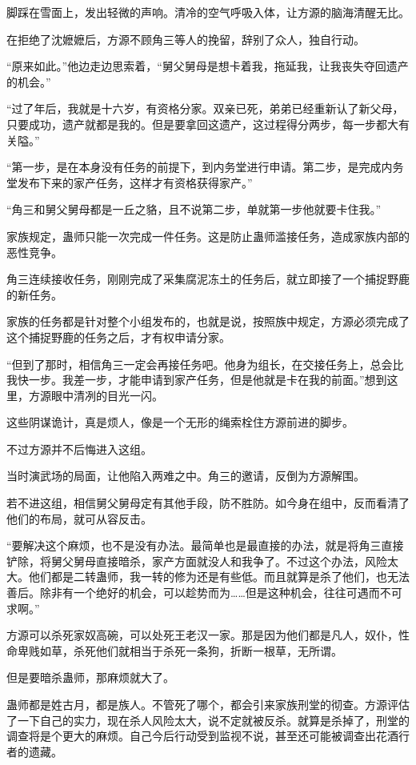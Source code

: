 \begin{this_body}
脚踩在雪面上，发出轻微的声响。清冷的空气呼吸入体，让方源的脑海清醒无比。

在拒绝了沈嬷嬷后，方源不顾角三等人的挽留，辞别了众人，独自行动。

“原来如此。”他边走边思索着，“舅父舅母是想卡着我，拖延我，让我丧失夺回遗产的机会。”

“过了年后，我就是十六岁，有资格分家。双亲已死，弟弟已经重新认了新父母，只要成功，遗产就都是我的。但是要拿回这遗产，这过程得分两步，每一步都大有关隘。”

“第一步，是在本身没有任务的前提下，到内务堂进行申请。第二步，是完成内务堂发布下来的家产任务，这样才有资格获得家产。”

“角三和舅父舅母都是一丘之貉，且不说第二步，单就第一步他就要卡住我。”

家族规定，蛊师只能一次完成一件任务。这是防止蛊师滥接任务，造成家族内部的恶性竞争。

角三连续接收任务，刚刚完成了采集腐泥冻土的任务后，就立即接了一个捕捉野鹿的新任务。

家族的任务都是针对整个小组发布的，也就是说，按照族中规定，方源必须完成了这个捕捉野鹿的任务之后，才有权申请分家。

“但到了那时，相信角三一定会再接任务吧。他身为组长，在交接任务上，总会比我快一步。我差一步，才能申请到家产任务，但是他就是卡在我的前面。”想到这里，方源眼中清冽的目光一闪。

这些阴谋诡计，真是烦人，像是一个无形的绳索栓住方源前进的脚步。

不过方源并不后悔进入这组。

当时演武场的局面，让他陷入两难之中。角三的邀请，反倒为方源解围。

若不进这组，相信舅父舅母定有其他手段，防不胜防。如今身在组中，反而看清了他们的布局，就可从容反击。

“要解决这个麻烦，也不是没有办法。最简单也是最直接的办法，就是将角三直接铲除，将舅父舅母直接暗杀，家产方面就没人和我争了。不过这个办法，风险太大。他们都是二转蛊师，我一转的修为还是有些低。而且就算是杀了他们，也无法善后。除非有一个绝好的机会，可以趁势而为……但是这种机会，往往可遇而不可求啊。”

方源可以杀死家奴高碗，可以处死王老汉一家。那是因为他们都是凡人，奴仆，性命卑贱如草，杀死他们就相当于杀死一条狗，折断一根草，无所谓。

但是要暗杀蛊师，那麻烦就大了。

蛊师都是姓古月，都是族人。不管死了哪个，都会引来家族刑堂的彻查。方源评估了一下自己的实力，现在杀人风险太大，说不定就被反杀。就算是杀掉了，刑堂的调查将是个更大的麻烦。自己今后行动受到监视不说，甚至还可能被调查出花酒行者的遗藏。


\end{this_body}
